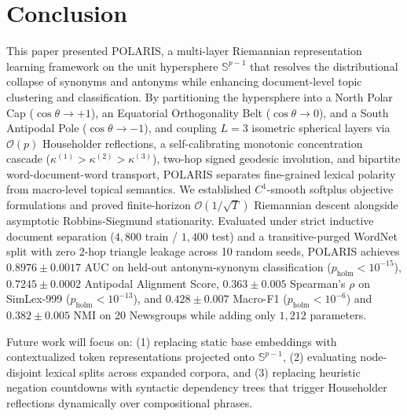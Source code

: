 \documentclass[journal]{IEEEtran}
\begin{document}
\section{Conclusion}
This paper presented POLARIS, a multi-layer Riemannian representation learning framework on the unit hypersphere $\mathbb{S}^{p-1}$ that resolves the distributional collapse of synonyms and antonyms while enhancing document-level topic clustering and classification. By partitioning the hypersphere into a North Polar Cap ($\cos\theta \to +1$), an Equatorial Orthogonality Belt ($\cos\theta \to 0$), and a South Antipodal Pole ($\cos\theta \to -1$), and coupling $L=3$ isometric spherical layers via $\mathcal{O}(p)$ Householder reflections, a self-calibrating monotonic concentration cascade ($\kappa^{(1)} > \kappa^{(2)} > \kappa^{(3)}$), two-hop signed geodesic involution, and bipartite word-document-word transport, POLARIS separates fine-grained lexical polarity from macro-level topical semantics. We established $C^1$-smooth softplus objective formulations and proved finite-horizon $\mathcal{O}(1/\sqrt{T})$ Riemannian descent alongside asymptotic Robbins-Siegmund stationarity. Evaluated under strict inductive document separation ($4,800$ train / $1,400$ test) and a transitive-purged WordNet split with zero 2-hop triangle leakage across 10 random seeds, POLARIS achieves $0.8976 \pm 0.0017$ AUC on held-out antonym-synonym classification ($p_{\text{holm}} < 10^{-15}$), $0.7245 \pm 0.0002$ Antipodal Alignment Score, $0.363 \pm 0.005$ Spearman's $\rho$ on SimLex-999 ($p_{\text{holm}} < 10^{-13}$), and $0.428 \pm 0.007$ Macro-F1 ($p_{\text{holm}} < 10^{-6}$) and $0.382 \pm 0.005$ NMI on 20 Newsgroups while adding only $1,212$ parameters.

Future work will focus on: (1) replacing static base embeddings with contextualized token representations projected onto $\mathbb{S}^{p-1}$, (2) evaluating node-disjoint lexical splits across expanded corpora, and (3) replacing heuristic negation countdowns with syntactic dependency trees that trigger Householder reflections dynamically over compositional phrases.
\end{document}
